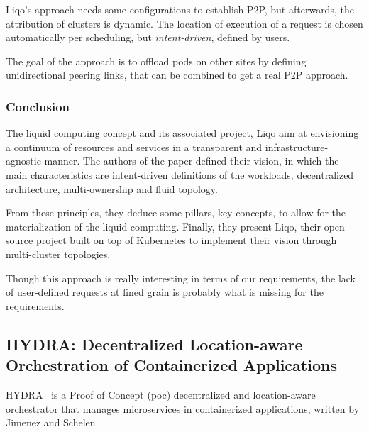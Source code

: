 Liqo's approach needs some configurations to establish \acrshort{P2P},
but afterwards, the attribution of clusters is dynamic.
%
The location of execution of a request is chosen automatically per
scheduling, but \emph{intent-driven}, defined by users.

%
The goal of the approach is to offload pods on other sites by defining
unidirectional peering links, that can be combined to get a real
\acrshort{P2P} approach.

\subsubsection*{Conclusion}

The liquid computing concept and its associated project, Liqo aim at
envisioning a continuum of resources and services in a transparent and
infrastructure-agnostic manner.
%
The authors of the paper defined their vision, in which the main
characteristics are intent-driven definitions of the workloads,
decentralized architecture, multi-ownership and fluid topology.

From these principles, they deduce some pillars, key concepts, to allow
for the materialization of the liquid computing.
%
Finally, they present Liqo, their open-source project built on top of
Kubernetes to implement their vision through multi-cluster topologies.

Though this approach is really interesting in terms of our
requirements, the lack of user-defined requests at fined grain is
probably what is missing for the requirements.



\subsection{HYDRA: Decentralized Location-aware Orchestration of
  Containerized Applications~\cite{JS20}}
\label{subsec:JS20}

HYDRA~\cite{JS20} is a Proof of Concept (\acrshort{poc}) decentralized and
location-aware orchestrator that manages microservices in
containerized applications, written by Jimenez and Schelen.

